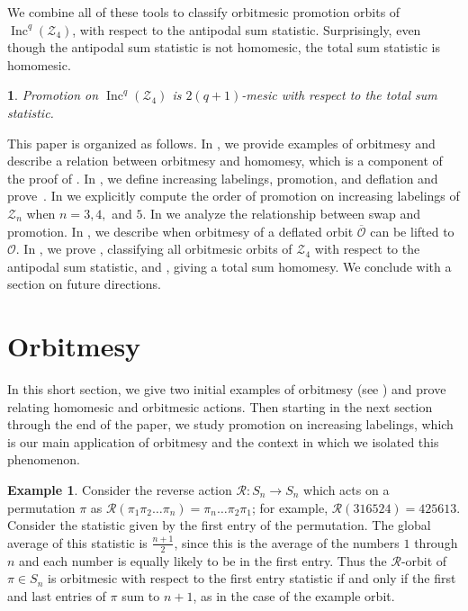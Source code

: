\documentclass[11pt]{amsart}
\newtheorem*{thme}{\Cref{Z4_totalsum}}
\theoremstyle{definition}
\newtheorem{example}[theorem]{Example}
\DeclareMathOperator{\Inc}{\mathrm{Inc}}
\newcommand{\calZ}{\mathcal{Z}}
\begin{document}
We combine all of these tools to classify orbitmesic promotion orbits of $\Inc^q(\mathcal{Z}_4)$, with respect to the antipodal sum statistic.
Surprisingly, even though the antipodal sum statistic is not homomesic, the total sum statistic is homomesic.

\begin{thme}
Promotion on $\Inc^q(\calZ_4)$ is $2(q+1)$-mesic with respect to the total sum statistic.
\end{thme}

This paper is organized as follows.
In , we provide examples of orbitmesy and describe
a relation between orbitmesy and homomesy,
which is a component of the proof of . 
In , we define increasing labelings, promotion, and deflation and prove~.
In  we explicitly compute the order of promotion on increasing labelings of $\mathcal{Z}_n$ when $n=3,4,$ and $5$.
In  we analyze the relationship between swap and promotion.
In , we describe when orbitmesy of a deflated orbit $\overline{\mathcal{O}}$ can be lifted to $\mathcal{O}$.
In , we prove , classifying all orbitmesic orbits of $\mathcal{Z}_4$ with respect to the antipodal sum statistic, and , giving a total sum homomesy.
We conclude with a section on future directions.





\section{Orbitmesy}\label{sec:Orbitmesy}
In this short section, we give two initial examples of orbitmesy (see ) and prove  relating homomesic and orbitmesic actions. Then starting in the next section through the end of the paper, we study promotion on increasing labelings, which is our main application of orbitmesy and the context in which we isolated this phenomenon.

\begin{example} Consider the reverse action $\mathcal{R}:S_n\rightarrow S_n$ which acts on a permutation $\pi$ as $\mathcal{R}(\pi_1\pi_2\ldots\pi_n)=\pi_n\ldots\pi_2\pi_1$; for example, $\mathcal{R}(316524)=425613$. 
Consider the statistic given by the first entry of the permutation. The global average of this statistic is $\frac{n+1}{2}$, since this is the average of the numbers $1$ through $n$ and each number is equally likely to be in the first entry. Thus the $\mathcal{R}$-orbit of $\pi\in S_n$ is orbitmesic with respect to the first entry statistic if and only if the first and last entries of $\pi$ sum to $n+1$, as in the case of the example orbit.
\end{example}
\end{document}
